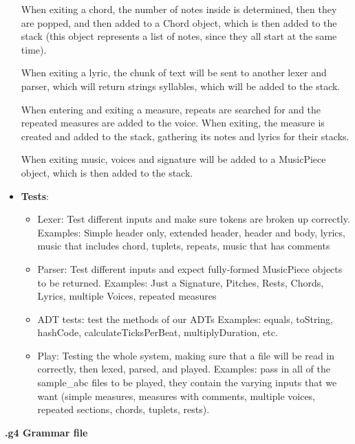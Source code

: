 \documentclass[12pt]{book}
\begin{document}
\begin{itemize}
When exiting a chord, the number of notes inside is determined, then they are popped, and then added to a Chord object, which is then added to the stack (this object represents a list of notes, since they all start at the same time).

When exiting a lyric, the chunk of text will be sent to another lexer and parser, which will return strings syllables, which will be added to the stack.

When entering and exiting a measure, repeats are searched for and the repeated measures are added to the voice. When exiting, the measure is created and added to the stack, gathering its notes and lyrics for their stacks.

When exiting music, voices and signature will be added to a MusicPiece object, which is then added to the stack.

\item {\bf Tests}:
\begin{itemize}
\item Lexer: Test different inputs and make sure tokens are broken up correctly. 
Examples: Simple header only, extended header, header and body, lyrics, music that includes chord, tuplets, repeats, music that has comments
\item Parser: Test different inputs and expect fully-formed MusicPiece objects to be returned. 
Examples: Just a Signature, Pitches, Rests, Chords, Lyrics, multiple Voices, repeated measures
\item ADT tests: test the methods of our ADTs
Examples: equals, toString, hashCode, calculateTicksPerBeat, multiplyDuration, etc.
\item Play: Testing the whole system, making sure that a file will be read in correctly, then lexed, parsed, and played.
Examples: pass in all of the sample\_abc files to be played, they contain the varying inputs that we want (simple measures, measures with comments, multiple voices, repeated sections, chords, tuplets, rests).
\end{itemize}

\end{itemize}

\bigskip
\centerline{{\large \bf .g4 Grammar file }}
\bigskip
\end{document}
